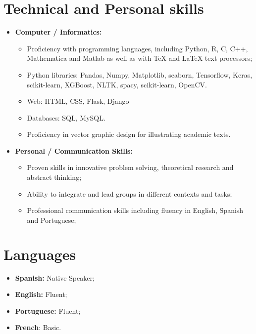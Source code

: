 \documentclass[11pt,a4paper,sans]{moderncv}        %
\begin{document}
\section{Technical and Personal skills}

\vspace{4pt}

\begin{itemize}

\item \textbf{Computer / Informatics:} 
\begin{itemize}
\item Proficiency with programming languages, including Python, R, C, C++, Mathematica and Matlab as well as with TeX and LaTeX text processors;
\item Python libraries: Pandas, Numpy, Matplotlib, seaborn, Tensorflow, Keras, scikit-learn, XGBoost, NLTK, spacy, scikit-learn, OpenCV.
\item Web: HTML, CSS, Flask, Django
\item Databases: SQL, MySQL.
\item Proficiency in vector graphic design for illustrating academic texts. 
\end{itemize}

\item \textbf{Personal / Communication Skills:} 

\begin{itemize}
\item Proven skills in innovative problem solving, theoretical research and abstract thinking;
\vspace{1pt}
\item Ability to integrate and lead groups in different contexts and tasks; 
\vspace{1pt}
\item Professional communication skills including fluency in English, Spanish and Portuguese;

\end{itemize}

\end{itemize}
\section{Languages}
\vspace{4pt}
\begin{itemize}
\item{\textbf{Spanish:}} Native Speaker;
\item{\textbf{English:}} Fluent;
\item{\textbf{Portuguese:}} Fluent;
\item{\textbf{French}:} Basic.
\end{itemize}
\end{document}
